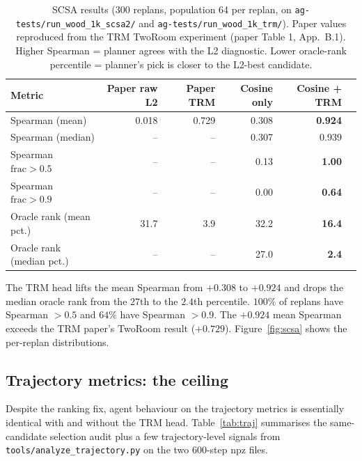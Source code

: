 \documentclass[11pt]{article}
\begin{document}
\begin{table}[t]
\centering
\caption{SCSA results (300 replans, population 64 per replan, on
\texttt{ag-tests/run\_wood\_1k\_scsa2/} and
\texttt{ag-tests/run\_wood\_1k\_trm/}). Paper values reproduced
from the TRM TwoRoom experiment (paper Table 1, App.~B.1). Higher
Spearman = planner agrees with the L2 diagnostic. Lower
oracle-rank percentile = planner's pick is closer to the
L2-best candidate.}
\label{tab:scsa}
\smallskip
\begin{tabular}{lrrrrr}
\toprule
Metric &
Paper raw L2 &
Paper TRM &
Cosine only &
Cosine + TRM \\
\midrule
Spearman (mean)          & 0.018 & 0.729 & 0.308 & \textbf{0.924} \\
Spearman (median)        & --    & --    & 0.307 & 0.939 \\
Spearman $\mathrm{frac} > 0.5$ & -- & -- & 0.13 & \textbf{1.00} \\
Spearman $\mathrm{frac} > 0.9$ & -- & -- & 0.00 & \textbf{0.64} \\
Oracle rank (mean pct.)  & 31.7  &  3.9  & 32.2  & \textbf{16.4} \\
Oracle rank (median pct.)& --    & --    & 27.0  & \textbf{ 2.4} \\
\bottomrule
\end{tabular}
\end{table}

The TRM head lifts the mean Spearman from $+0.308$ to $+0.924$ and
drops the median oracle rank from the $27$th to the $2.4$th
percentile. $100\%$ of replans have Spearman $> 0.5$ and $64\%$
have Spearman $> 0.9$. The $+0.924$ mean Spearman exceeds the
TRM paper's TwoRoom result ($+0.729$). Figure~\ref{fig:scsa}
shows the per-replan distributions.

\subsection{Trajectory metrics: the ceiling}
\label{ssec:results-traj}

Despite the ranking fix, agent behaviour on the trajectory
metrics is essentially identical with and without the TRM head.
Table~\ref{tab:traj} summarises the same-candidate selection
audit plus a few trajectory-level signals from
\texttt{tools/analyze\_trajectory.py} on the two 600-step npz
files.
\end{document}
